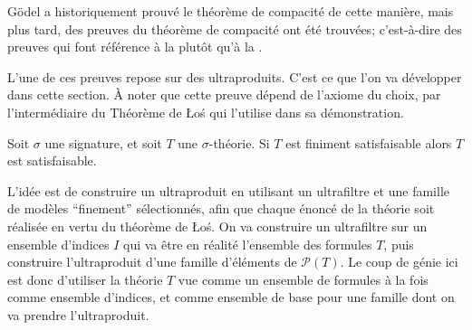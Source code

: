 Gödel a historiquement prouvé le théorème de compacité de cette manière, mais plus tard, des preuves  du théorème de compacité ont été trouvées; c'est-à-dire des preuves qui font référence à la  plutôt qu'à la .

L'une de ces preuves repose sur des ultraproduits. C'est ce que l'on va développer dans cette section. À noter que cette preuve dépend de l'axiome du choix, par l'intermédiaire du Théorème de Łoś qui l'utilise dans sa démonstration.

\begin{theorem}
	Soit $\sigma$ une signature, et soit $T$ une $\sigma$-théorie. Si $T$ est finiment satisfaisable alors $T$ est satisfaisable. 
\end{theorem}

L'idée est de construire un ultraproduit en utilisant un ultrafiltre et une famille de modèles ``finement'' sélectionnés, afin que chaque énoncé de la théorie soit réalisée en vertu du théorème de Łoś. On va construire un ultrafiltre sur un ensemble d'indices $I$ qui va être en réalité l'ensemble des formules $T$, puis construire l'ultraproduit d'une famille d'éléments de $\mathcal{P}\left(T\right)$. Le coup de génie ici est donc d'utiliser la théorie $T$ vue comme un ensemble de formules à la fois comme ensemble d'indices, et comme ensemble de base pour une famille dont on va prendre l'ultraproduit.

